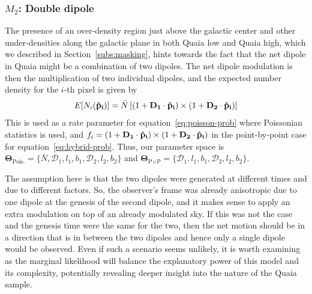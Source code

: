 \documentclass[fleqn,usenatbib]{mnras}
\begin{document}
    \subsubsection{$M_2$: Double dipole}
        \label{subs:double-dipole}
        The presence of an over-density region just above the galactic center and other under-densities along the galactic plane in both Quaia low and Quaia high, which we described in Section~\ref{subs:masking}, hints towards the fact that the net dipole in Quaia might be a combination of two dipoles.
        The net dipole modulation is then the multiplication of two individual dipoles, and the expected number density for the $i$-th pixel is given by
        \begin{equation}
            E [N_i (\mathbf{\hat{p}_i}) ] = \bar{N}\left[(1 + \mathcal{\bf D_{1}} \cdot {\bf \hat{p}_{i}}) \times (1 + \mathcal{\bf D_{2}} \cdot {\bf \hat{p}_{i}})\right] \label{eq:double-dipole-multiplicative}
        \end{equation}
        This is used as a rate parameter for equation~\eqref{eq:poisson-prob} where Poissonian statistics is used, and $f_i = (1 + \mathcal{\bf D_{1}} \cdot {\bf \hat{p}_{i}}) \times (1 + \mathcal{\bf D_{2}} \cdot {\bf \hat{p}_{i}})$ in the point-by-point case for equation~\eqref{eq:hybrid-prob}.
        Thus, our parameter space is $\mathbf{\Theta}_{\text{Pois.}} = \{ \bar{N}, \mathcal{D}_{1}, l_{1}, b_{1}, \mathcal{D}_{2}, l_{2}, b_{2} \}$ and $\mathbf{\Theta}_{\text{P}\times\text{P}} = \{ \mathcal{D}_{1}, l_{1}, b_{1}, \mathcal{D}_{2}, l_{2}, b_{2} \}$.
        
        The assumption here is that the two dipoles were generated at different times and due to different factors. 
        So, the observer's frame was already anisotropic due to one dipole at the genesis of the second dipole, and it makes sense to apply an extra modulation on top of an already modulated sky.
        If this was not the case and the genesis time were the same for the two, then the net motion should be in a direction that is in between the two dipoles and hence only a single dipole would be observed. 
        Even if such a scenario seems unlikely, it is worth examining as the marginal likelihood will balance the explanatory power of this model and its complexity, potentially revealing deeper insight into the nature of the Quaia sample.
        
    
    
\end{document}
